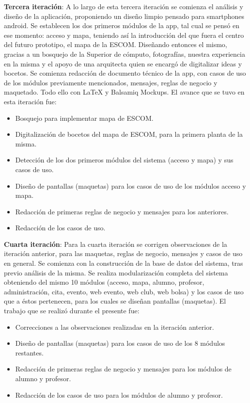 \noindent
\textbf{Tercera iteración}: A lo largo de esta tercera iteración se comienza el análisis y diseño de la aplicación, proponiendo un diseño limpio pensado para smartphones android. Se establecen los dos primeros módulos de la app, tal cual se pensó en ese momento: acceso y mapa, teniendo así la introducción del que fuera el centro del futuro prototipo, el mapa de la ESCOM. Diseñando entonces el mismo, gracias a un bosquejo de la Superior de cómputo, fotografías, nuestra experiencia en la misma y el apoyo de una arquitecta quien se encargó de digitalizar ideas y bocetos. Se comienza redacción de documento técnico de la app, con casos de uso de los módulos previamente mencionados, mensajes, reglas de negocio y maquetado. Todo ello con LaTeX y Balsamiq Mockups. El avance que se tuvo en esta iteración fue: 
\begin{itemize}
	\item Bosquejo para implementar mapa de ESCOM.
	\item Digitalización de bocetos del mapa de ESCOM, para la primera planta de la misma.
	\item Detección de los dos primeros módulos del sistema (acceso y mapa) y sus casos de uso.
	\item Diseño de pantallas (maquetas) para los casos de uso de los módulos acceso y mapa.
	\item Redacción de primeras reglas de negocio y mensajes para los anteriores.
	\item Redacción de los casos de uso. 
\end{itemize}

\noindent
\textbf{Cuarta iteración}: Para la cuarta iteración se corrigen observaciones de la iteración anterior, para las maquetas, reglas de negocio, mensajes y casos de uso en general. Se comienza con la construcción de la base de datos del sistema, tras previo análisis de la misma. Se realiza modularización completa del sistema obteniendo del mismo 10 módulos (acceso, mapa, alumno, profesor, administración, cita, evento, web evento, web club, web bolsa) y los casos de uso que a éstos pertenecen, para los cuales se diseñan pantallas (maquetas). El trabajo que se realizó durante el presente fue: 
\begin{itemize}
	\item Correcciones a las observaciones realizadas en la iteración anterior. 
	\item Diseño de pantallas (maquetas) para los casos de uso de los 8 módulos restantes.
	\item Redacción de primeras reglas de negocio y mensajes para los módulos de alumno y profesor.
	\item Redacción de los casos de uso para los módulos de alumno y profesor.
\end{itemize}

